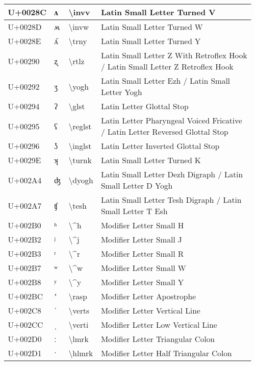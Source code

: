 \begin{table}[h]
\begin{tabulary}{\linewidth}{|L|L|L|L|}
\hline
U+0028C & ʌ & {\textbackslash}invv & Latin Small Letter Turned V \\
\hline
U+0028D & ʍ & {\textbackslash}invw & Latin Small Letter Turned W \\
\hline
U+0028E & ʎ & {\textbackslash}trny & Latin Small Letter Turned Y \\
\hline
U+00290 & ʐ & {\textbackslash}rtlz & Latin Small Letter Z With Retroflex Hook / Latin Small Letter Z Retroflex Hook \\
\hline
U+00292 & ʒ & {\textbackslash}yogh & Latin Small Letter Ezh / Latin Small Letter Yogh \\
\hline
U+00294 & ʔ & {\textbackslash}glst & Latin Letter Glottal Stop \\
\hline
U+00295 & ʕ & {\textbackslash}reglst & Latin Letter Pharyngeal Voiced Fricative / Latin Letter Reversed Glottal Stop \\
\hline
U+00296 & ʖ & {\textbackslash}inglst & Latin Letter Inverted Glottal Stop \\
\hline
U+0029E & ʞ & {\textbackslash}turnk & Latin Small Letter Turned K \\
\hline
U+002A4 & ʤ & {\textbackslash}dyogh & Latin Small Letter Dezh Digraph / Latin Small Letter D Yogh \\
\hline
U+002A7 & ʧ & {\textbackslash}tesh & Latin Small Letter Tesh Digraph / Latin Small Letter T Esh \\
\hline
U+002B0 & ʰ & {\textbackslash}{\textasciicircum}h & Modifier Letter Small H \\
\hline
U+002B2 & ʲ & {\textbackslash}{\textasciicircum}j & Modifier Letter Small J \\
\hline
U+002B3 & ʳ & {\textbackslash}{\textasciicircum}r & Modifier Letter Small R \\
\hline
U+002B7 & ʷ & {\textbackslash}{\textasciicircum}w & Modifier Letter Small W \\
\hline
U+002B8 & ʸ & {\textbackslash}{\textasciicircum}y & Modifier Letter Small Y \\
\hline
U+002BC & ʼ & {\textbackslash}rasp & Modifier Letter Apostrophe \\
\hline
U+002C8 & ˈ & {\textbackslash}verts & Modifier Letter Vertical Line \\
\hline
U+002CC & ˌ & {\textbackslash}verti & Modifier Letter Low Vertical Line \\
\hline
U+002D0 & ː & {\textbackslash}lmrk & Modifier Letter Triangular Colon \\
\hline
U+002D1 & ˑ & {\textbackslash}hlmrk & Modifier Letter Half Triangular Colon \\

\end{tabulary}
\end{table}
